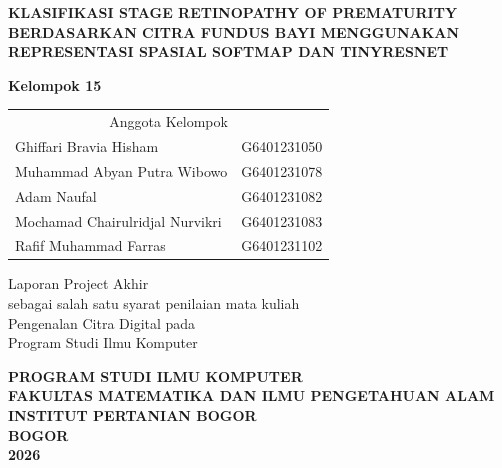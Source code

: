 
\clearpage
\thispagestyle{empty}
\begin{center}

\vspace*{1cm}

{\fontsize{14pt}{17pt}\selectfont\bfseries
KLASIFIKASI STAGE RETINOPATHY OF PREMATURITY\\
BERDASARKAN CITRA FUNDUS BAYI MENGGUNAKAN\\
REPRESENTASI SPASIAL SOFTMAP DAN TINYRESNET
}

\vspace{2.5cm}

{\fontsize{12pt}{14pt}\selectfont\bfseries
Kelompok 15
}

\vspace{0.5cm}

{\fontsize{12pt}{14pt}\selectfont
\begin{tabular}{ll}
\multicolumn{2}{c}{Anggota Kelompok}\\[0.3cm]
Ghiffari Bravia Hisham       & G6401231050 \\
Muhammad Abyan Putra Wibowo  & G6401231078 \\
Adam Naufal                  & G6401231082 \\
Mochamad Chairulridjal Nurvikri & G6401231083 \\
Rafif Muhammad Farras        & G6401231102 \\
\end{tabular}
}

\vspace{2cm}

{\fontsize{12pt}{14pt}\selectfont
Laporan Project Akhir\\
sebagai salah satu syarat penilaian mata kuliah\\
Pengenalan Citra Digital pada\\
Program Studi Ilmu Komputer
}

\vfill

{\fontsize{14pt}{17pt}\selectfont\bfseries
PROGRAM STUDI ILMU KOMPUTER\\
FAKULTAS MATEMATIKA DAN ILMU PENGETAHUAN ALAM\\
INSTITUT PERTANIAN BOGOR\\
BOGOR\\
2026
}

\end{center}
\clearpage
